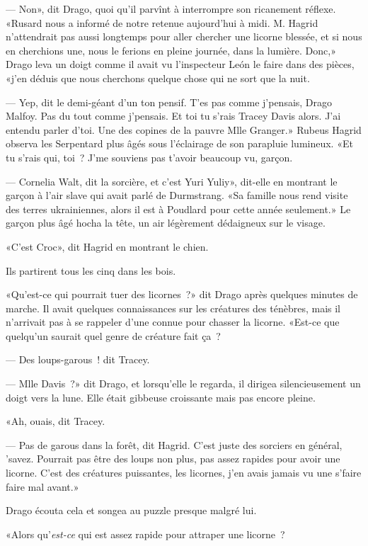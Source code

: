 --- Non», dit Drago, quoi qu'il parvînt à interrompre son ricanement réflexe. «Rusard nous a informé de notre retenue aujourd'hui à midi. M. Hagrid n'attendrait pas aussi longtemps pour aller chercher une licorne blessée, et si nous en cherchions une, nous le ferions en pleine journée, dans la lumière. Donc,» Drago leva un doigt comme il avait vu l'inspecteur León le faire dans des pièces, «j'en déduis que nous cherchons quelque chose qui ne sort que la nuit.

--- Yep, dit le demi-géant d'un ton pensif. T'es pas comme j'pensais, Drago Malfoy. Pas du tout comme j'pensais. Et toi tu s'rais Tracey Davis alors. J'ai entendu parler d'toi. Une des copines de la pauvre Mlle Granger.» Rubeus Hagrid observa les Serpentard plus âgés sous l'éclairage de son parapluie lumineux. «Et tu s'rais qui, toi~? J'me souviens pas t'avoir beaucoup vu, garçon.

--- Cornelia Walt, dit la sorcière, et c'est Yuri Yuliy», dit-elle en montrant le garçon à l'air slave qui avait parlé de Durmstrang. «Sa famille nous rend visite des terres ukrainiennes, alors il est à Poudlard pour cette année seulement.» Le garçon plus âgé hocha la tête, un air légèrement dédaigneux sur le visage.

«C'est Croc», dit Hagrid en montrant le chien.

Ils partirent tous les cinq dans les bois.

«Qu'est-ce qui pourrait tuer des licornes~?» dit Drago après quelques minutes de marche. Il avait quelques connaissances sur les créatures des ténèbres, mais il n'arrivait pas à se rappeler d'une connue pour chasser la licorne. «Est-ce que quelqu'un saurait quel genre de créature fait ça~?

--- Des loups-garous~! dit Tracey.

--- Mlle Davis~?» dit Drago, et lorsqu'elle le regarda, il dirigea silencieusement un doigt vers la lune. Elle était gibbeuse croissante mais pas encore pleine.

«Ah, ouais, dit Tracey.

--- Pas de garous dans la forêt, dit Hagrid. C'est juste des sorciers en général, 'savez. Pourrait pas être des loups non plus, pas assez rapides pour avoir une licorne. C'est des créatures puissantes, les licornes, j'en avais jamais vu une s'faire faire mal avant.»

Drago écouta cela et songea au puzzle presque malgré lui.

«Alors qu'\emph{est-ce} qui est assez rapide pour attraper une licorne~?

